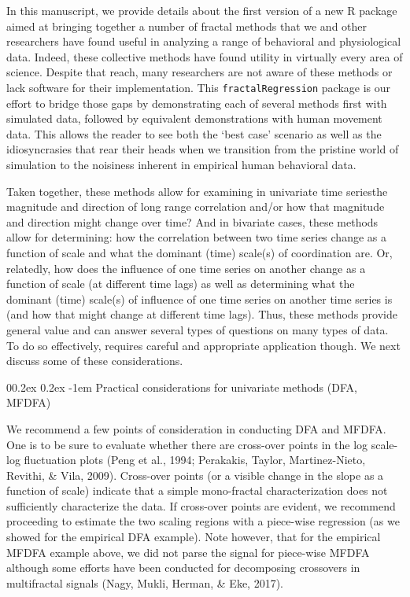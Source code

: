 \documentclass[
  man]{apa6}
\makeatletter
\let\oldparagraph\paragraph
\renewcommand{\paragraph}[1]{\oldparagraph{#1}\mbox{}}
\renewcommand{\paragraph}{\@startsection{paragraph}{4}{\parindent}%
  {0\baselineskip \@plus 0.2ex \@minus 0.2ex}%
  {-1em}%
  {\normalfont\normalsize\bfseries\itshape\typesectitle}}
\makeatother
\begin{document}
In this manuscript, we provide details about the first version of a new
R package aimed at bringing together a number of fractal methods that we
and other researchers have found useful in analyzing a range of
behavioral and physiological data. Indeed, these collective methods have
found utility in virtually every area of science. Despite that reach,
many researchers are not aware of these methods or lack software for
their implementation. This \texttt{fractalRegression} package is our effort to
bridge those gaps by demonstrating each of several methods first with
simulated data, followed by equivalent demonstrations with human
movement data. This allows the reader to see both the `best case'
scenario as well as the idiosyncrasies that rear their heads when we
transition from the pristine world of simulation to the noisiness
inherent in empirical human behavioral data.

Taken together, these methods allow for examining in univariate time
seriesthe magnitude and direction of long range correlation and/or how
that magnitude and direction might change over time? And in bivariate
cases, these methods allow for determining: how the correlation between
two time series change as a function of scale and what the dominant
(time) scale(s) of coordination are. Or, relatedly, how does the
influence of one time series on another change as a function of scale
(at different time lags) as well as determining what the dominant (time)
scale(s) of influence of one time series on another time series is (and
how that might change at different time lags). Thus, these methods
provide general value and can answer several types of questions on many
types of data. To do so effectively, requires careful and appropriate
application though. We next discuss some of these considerations.

\hypertarget{practical-considerations-for-univariate-methods-dfa-mfdfa}{%
\paragraph{Practical considerations for univariate methods (DFA, MFDFA)}\label{practical-considerations-for-univariate-methods-dfa-mfdfa}}

We recommend a few points of consideration in conducting DFA and MFDFA.
One is to be sure to evaluate whether there are cross-over points in the
log scale-log fluctuation plots (Peng et al., 1994; Perakakis, Taylor, Martinez-Nieto, Revithi, \& Vila, 2009). Cross-over points (or a visible change in the slope as
a function of scale) indicate that a simple mono-fractal
characterization does not sufficiently characterize the data. If
cross-over points are evident, we recommend proceeding to estimate the
two scaling regions with a piece-wise regression (as we showed for the
empirical DFA example). Note however, that for the empirical MFDFA
example above, we did not parse the signal for piece-wise MFDFA although
some efforts have been conducted for decomposing crossovers in
multifractal signals (Nagy, Mukli, Herman, \& Eke, 2017).
\end{document}
